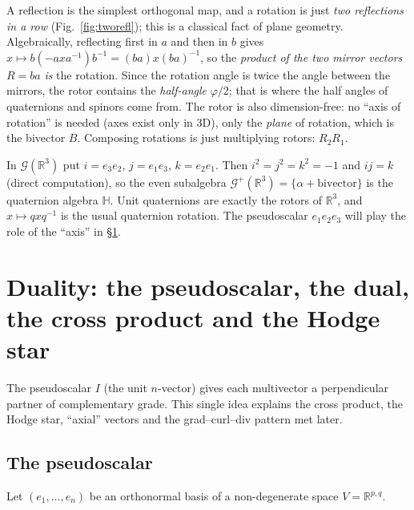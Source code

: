\documentclass[11pt,a4paper]{article}
\numberwithin{equation}{section}
\theoremstyle{definition}
\theoremstyle{plain}
\newcommand{\R}{\mathbb{R}}
\newcommand{\Hq}{\mathbb{H}}
\newcommand{\Cl}{\mathrm{Cl}}
\newcommand{\GA}{\mathcal{G}}
\newcommand{\pss}{I}
\begin{document}
\begin{intuition}
A reflection is the simplest orthogonal map, and a rotation is just \emph{two reflections in a row} (Fig.~\ref{fig:tworefl}); this is a classical fact of plane geometry.
Algebraically, reflecting first in $a$ and then in $b$ gives $x\mapsto b(-axa^{-1})b^{-1}=(ba)x(ba)^{-1}$, so the \emph{product of the two mirror vectors} $R=ba$ \emph{is} the rotation.
Since the rotation angle is twice the angle between the mirrors, the rotor contains the \emph{half-angle} $\varphi/2$; that is where the half angles of quaternions and spinors come from. The rotor is also dimension-free: no ``axis of rotation'' is needed (axes exist only in $3$D), only the \emph{plane} of rotation, which is the bivector $B$. Composing rotations is just multiplying rotors: $R_2R_1$.
\end{intuition}

\begin{example}[Quaternions inside $\Cl(3,0)$]
In $\GA(\R^3)$ put $i=e_3e_2$, $j=e_1e_3$, $k=e_2e_1$. Then $i^2=j^2=k^2=-1$ and $ij=k$ (direct computation), so the even subalgebra $\GA^+(\R^3)=\{\alpha+\text{bivector}\}$ is the quaternion algebra $\Hq$. Unit quaternions are exactly the rotors of $\R^3$, and $x\mapsto qxq^{-1}$ is the usual quaternion rotation. The pseudoscalar $e_1e_2e_3$ will play the role of the ``axis'' in \S\ref{sec:duality}.
\end{example}



\section{Duality: the pseudoscalar, the dual, the cross product and the Hodge star}\label{sec:duality}

The pseudoscalar $\pss$ (the unit $n$-vector) gives each multivector a perpendicular partner of complementary grade. This
single idea explains the cross product, the Hodge star, ``axial'' vectors and the grad--curl--div pattern met later.

\subsection{The pseudoscalar}

Let $(e_1,\dots,e_n)$ be an orthonormal basis of a non-degenerate space $V=\R^{p,q}$.
\end{document}
